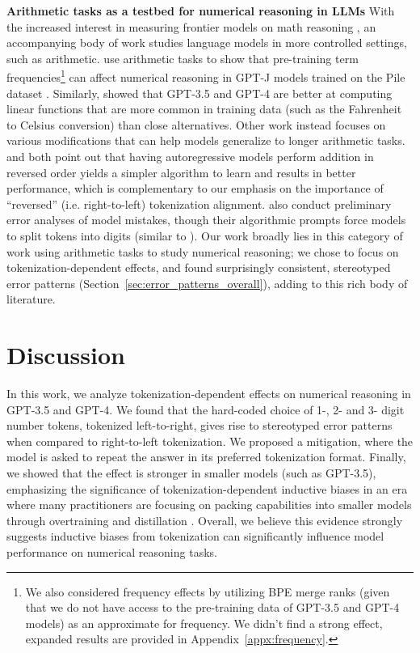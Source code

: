 \documentclass{article}
\theoremstyle{plain}
\theoremstyle{definition}
\theoremstyle{remark}
\begin{document}
\textbf{Arithmetic tasks as a testbed for numerical reasoning in LLMs} With the increased interest in measuring frontier models on math reasoning \cite{saxton2018math, cobbe2021gsm8k, lewkowycz2022minerva, hendrycks2021math, paster2023hungarian}, an accompanying body of work studies language models in more controlled settings, such as arithmetic. \citet{razeghi2022frequencies} use arithmetic tasks to show that pre-training term frequencies\footnote{We also considered frequency effects by utilizing BPE merge ranks (given that we do not have access to the pre-training data of GPT-3.5 and GPT-4 models) as an approximate for frequency. We didn't find a strong effect, expanded results are provided in Appendix~\ref{appx:frequency}.} can affect numerical reasoning in GPT-J models \cite{wang2021gptj} trained on the Pile dataset \cite{gao2020pile}. Similarly, \citet{mccoy2023embers} showed that GPT-3.5 and GPT-4 are better at computing linear functions that are more common in training data (such as the Fahrenheit to Celsius conversion) than close alternatives. Other work \cite{nogueira2021arithmetic, muffo2022arithmetic, zhou2022algo_prompting, zhou2023rasp} instead focuses on various modifications that can help models generalize to longer arithmetic tasks. \citet{zhou2023rasp} and \citet{lee2023arithmetic} both point out that having autoregressive models perform addition in reversed order yields a simpler algorithm to learn and results in better performance, which is complementary to our emphasis on the importance of ``reversed'' (i.e. right-to-left) tokenization alignment. \citet{zhou2022algo_prompting} also conduct preliminary error analyses of model mistakes, though their algorithmic prompts force models to split tokens into digits (similar to \citet{nye2021scratchpad}). Our work broadly lies in this category of work using arithmetic tasks to study numerical reasoning; we chose to focus on tokenization-dependent effects, and found surprisingly consistent, stereotyped error patterns (Section~\ref{sec:error_patterns_overall}), adding to this rich body of literature. 

\section{Discussion}
\label{sec:discussion}

In this work, we analyze tokenization-dependent effects on numerical reasoning in GPT-3.5 and GPT-4. We found that the hard-coded choice of 1-, 2- and 3- digit number tokens, tokenized left-to-right, gives rise to stereotyped error patterns when compared to right-to-left tokenization. We proposed a mitigation, where the model is asked to repeat the answer in its preferred tokenization format. Finally, we showed that the effect is stronger in smaller models (such as GPT-3.5), emphasizing the significance of tokenization-dependent inductive biases in an era where many practitioners are focusing on packing capabilities into smaller models through overtraining \citep{devries2023overtraining, touvron2023llama1} and distillation \cite{li2023textbooks,geminiteam2023gemini}. Overall, we believe this evidence strongly suggests inductive biases from tokenization can significantly influence model performance on numerical reasoning tasks.
\end{document}
